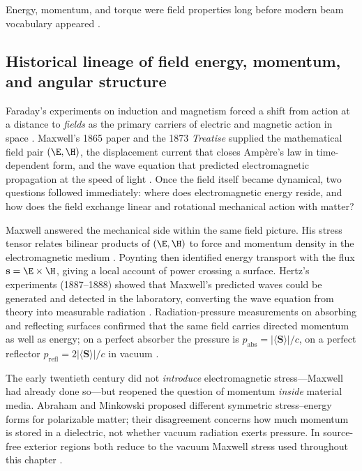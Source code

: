 Energy, momentum, and torque were field properties long before modern beam vocabulary appeared \cite{poynting1884,beth1936}.

\subsection{Historical lineage of field energy, momentum, and angular structure}
\label{sec:ch01.0.historical-lineage}

Faraday's experiments on induction and magnetism forced a shift from action at a
distance to \emph{fields} as the primary carriers of electric and magnetic action in
space \cite{maxwell1873}. Maxwell's 1865 paper and the 1873 \emph{Treatise} supplied the
mathematical field pair $(\E,\H)$, the displacement current that closes Amp\`ere's law in
time-dependent form, and the wave equation that predicted electromagnetic propagation at
the speed of light \cite{maxwell1873}. Once the field itself became dynamical, two
questions followed immediately: where does electromagnetic energy reside, and how does
the field exchange linear and rotational mechanical action with matter?

Maxwell answered the mechanical side within the same field picture. His stress tensor
relates bilinear products of $(\E,\H)$ to force and momentum density in the
electromagnetic medium \cite{maxwell1873,stratton1941}. Poynting \cite{poynting1884}
then identified energy transport with the flux $\mathbf{s}=\E\times\H$, giving a local
account of power crossing a surface. Hertz's experiments (1887--1888) showed that
Maxwell's predicted waves could be generated and detected in the laboratory, converting
the wave equation from theory into measurable radiation \cite{stratton1941}. Radiation-pressure
measurements on absorbing and reflecting surfaces confirmed that the same field carries
directed momentum as well as energy; on a perfect absorber the pressure is $p_{\mathrm{abs}}=|\langle\mathbf{S}\rangle|/c$, on a
perfect reflector $p_{\mathrm{refl}}=2|\langle\mathbf{S}\rangle|/c$ in vacuum \cite{stratton1941}.

The early twentieth century did not \emph{introduce} electromagnetic stress---Maxwell
had already done so---but reopened the question of momentum \emph{inside} material
media. Abraham \cite{abraham1910} and Minkowski \cite{minkowski1908} proposed different
symmetric stress--energy forms for polarizable matter; their disagreement concerns how
much momentum is stored in a dielectric, not whether vacuum radiation exerts pressure.
In source-free exterior regions both reduce to the vacuum Maxwell stress used throughout
this chapter \cite{stratton1941}.


